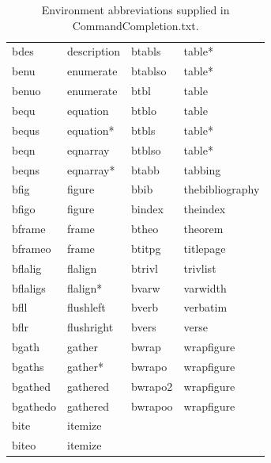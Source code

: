 \documentclass[11pt]{article}
\newcommand{\CCT}{\textsf{CommandCompletion.txt}}
\begin{document}
\begin{table}
\begin{tabular}{llll}
bdes      & description & btabls  & table* \\
benu      & enumerate   & btablso & table* \\
benuo     & enumerate   & btbl    & table \\
bequ      & equation    & btblo   & table \\
bequs     & equation*   & btbls   & table* \\
beqn      & eqnarray    & btblso  & table* \\
beqns     & eqnarray*   & btabb   & tabbing \\
bfig      & figure      & bbib    & thebibliography \\
bfigo     & figure      & bindex  & theindex \\
bframe    & frame       & btheo   & theorem \\
bframeo   & frame       & btitpg  & titlepage \\
bflalig   & flalign     & btrivl  & trivlist \\
bflaligs  & flalign*    & bvarw   & varwidth \\
bfll      & flushleft   & bverb   & verbatim \\
bflr      & flushright  & bvers   & verse \\
bgath     & gather      & bwrap   & wrapfigure \\
bgaths    & gather*     & bwrapo  & wrapfigure \\
bgathed   & gathered    & bwrapo2 & wrapfigure \\
bgathedo  & gathered    & bwrapoo & wrapfigure \\
bite      & itemize     &         & \\
biteo     & itemize     &         & \\
\end{tabular}
\caption{Environment abbreviations supplied in \CCT.}
\label{tbl:environments}
\end{table}
\end{document}
